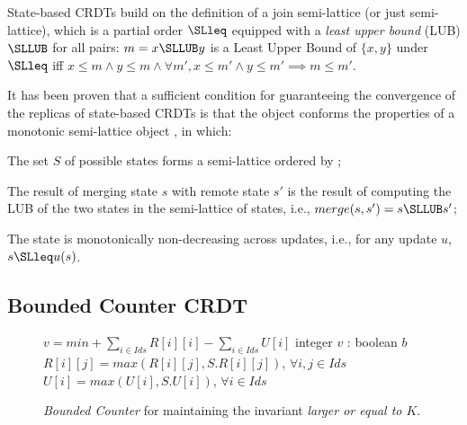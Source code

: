 \documentclass[conference]{IEEEtran}
\newcommand{\InvCounter}{\emph{Bounded Counter}}
\begin{document}
State-based CRDTs build on the definition of 
a join semi-lattice (or just semi-lattice), which is a
partial order $\SLleq$ equipped with a \emph{least upper bound} (LUB)
$\SLLUB$ for all pairs:
  $m = x \SLLUB y$ is a Least Upper Bound of
  $\{x,y\}$ under $\SLleq$ iff 
$x \le m \land y \le m \wedge \forall m', 
     x \le m' \land y \le m' 
         \implies
       m \le m'$.

It has been proven that a sufficient condition for guaranteeing the convergence 
of the replicas of state-based CRDTs is that the object conforms the properties of 
a monotonic semi-lattice object \cite{crdts}, in which:
\begin{inparaenum}[\em (i)]
\item 
  The set $S$ of possible states forms a semi-lattice ordered by \SLleq;
\item
  The result of merging state $s$ with remote state $s'$ is the result of
  computing the LUB of the two
  states in the semi-lattice of states, i.e., $merge(s,s') = s \SLLUB s'$;
\item
  The state is monotonically non-decreasing across updates, i.e., for any update
  $u$, $s \SLleq u(s)$.
\end{inparaenum}

\subsection{Bounded Counter CRDT}



\begin{figure}[t]
\begin{algorithmic}
\EndPayloadML
{}
	\Let $v = min + \sum\limits_{i \in \mathit{Ids}} R[i][i] - \sum\limits_{i \in \mathit{Ids}} U[i]$
\EndQuery
{} integer $v$
\EndQuery
{}
\EndUpdate
{}
\EndUpdate
{}: boolean $b$
\EndUpdate
{}
	\Let $R[i][j] = max(R[i][j],S.R[i][j])$, $\forall{i,j \in \mathit{Ids}}$
	\Let $U[i] = max(U[i],S.U[i])$, $\forall{i \in \mathit{Ids}}$
\EndUpdate
\end{algorithmic}
\vspace{-2ex}
\caption{\InvCounter{} for maintaining the invariant \emph{larger or equal to $K$}.}\label{fig:invcounter:spec}
\vspace{-2ex}
\end{figure}
\end{document}
